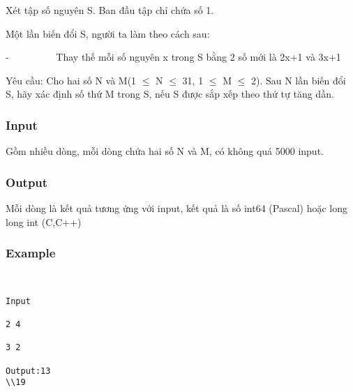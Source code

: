 



   Xét tập số nguyên S. Ban đầu tập chỉ chứa số 1.  

   Một lần biến đổi S, người ta làm theo cách sau:  

   -          Thay thế mỗi số nguyên x trong S bằng 2 số mới là 2x+1 và 3x+1  

   Yêu cầu: Cho hai số N và M(1 $\le$ N $\le$ 31, 1 $\le$ M $\le$ 2\textasciicircumN). Sau N lần biến đổi S, hãy xác định số thứ M trong S, nếu S được sắp xếp theo thứ tự tăng dần.  

\subsubsection{   Input  }

   Gồm nhiều dòng, mỗi dòng chứa hai số N và M, có không quá 5000 input.  

\subsubsection{   Output  }

   Mỗi dòng là kết quả tương ứng với input, kết quả là số int64 (Pascal) hoặc long long int (C,C++)  

\subsubsection{   Example  }
\begin{verbatim}


Input

2 4

3 2

Output:13
\\19\end{verbatim}
